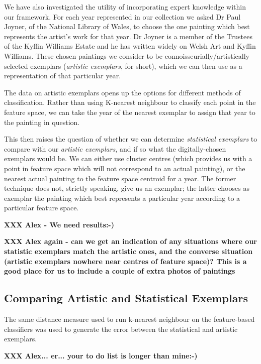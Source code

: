 \documentclass[conference,a4paper]{IEEEtran}
\begin{document}
We have also investigated the utility of incorporating expert knowledge within
our framework. For each year represented in our collection we asked Dr Paul
Joyner, of the National Library of Wales, to choose the one painting which best
represents the artist's work for that year. Dr Joyner is a member of the
Trustees of the Kyffin Williams Estate and he has written widely on Welsh Art
and Kyffin Williams. These chosen paintings we consider to be
connoisseurially/artistically selected exemplars (\emph{artistic exemplars}, for
short), which we can then use as a representation of that particular year.

The data on artistic exemplars opens up the options for different methods of
classification. Rather than using K-nearest neighbour to classify each point in
the feature space, we can take the year of the nearest exemplar to assign that year
to the painting in question. 

This then raises the question of whether we can determine \emph{statistical
exemplars} to compare with our \emph{artistic exemplars}, and if so what the
digitally-chosen exemplars would be.  We can either use cluster centres (which
provides us with a point in feature space which will not correspond to an
actual painting), or the nearest actual painting to the feature space centroid
for a year. The former technique does not, strictly speaking, give us an
exemplar; the latter chooses as exemplar the painting which best represents a
particular year according to a particular feature space. 

\textbf{XXX Alex - We need results:-)}

\textbf{XXX Alex again - can we get an indication of any situations where our statistic exemplars match the artistic ones, and the converse situation (artistic exemplars nowhere near centres of feature space)? This is a good place for us to include a couple of extra photos of paintings}

\subsection{Comparing Artistic and Statistical Exemplars}

The same distance measure used to run k-nearest neighbour on the feature-based classifiers was
used to generate the error between the statistical and artistic exemplars.


\textbf{XXX Alex... er... your to do list is longer than mine:-)}
\end{document}
